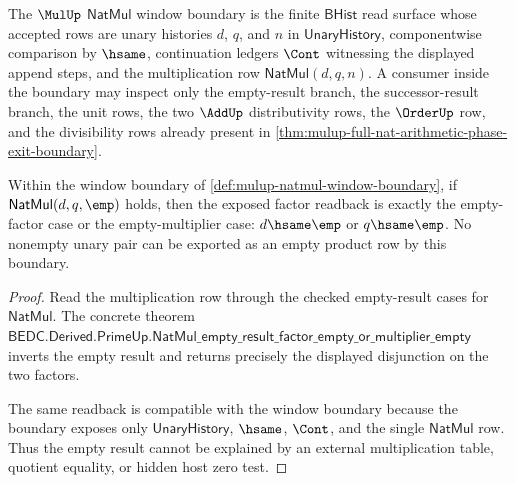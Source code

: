 \begin{definition}
\label{def:mulup-natmul-window-boundary}
The $\MulUp$ $\mathsf{NatMul}$ window boundary is the finite
$\mathsf{BHist}$ read surface whose accepted rows are unary histories
$d$, $q$, and $n$ in $\mathsf{UnaryHistory}$, componentwise comparison by
$\hsame$, continuation ledgers $\Cont$ witnessing the displayed append
steps, and the multiplication row $\mathsf{NatMul}(d,q,n)$. A consumer
inside the boundary may inspect only the empty-result branch, the
successor-result branch, the unit rows, the two $\AddUp$ distributivity
rows, the $\OrderUp$ row, and the divisibility rows already present in
\autoref{thm:mulup-full-nat-arithmetic-phase-exit-boundary}.
\end{definition}

\begin{theorem}
\label{thm:mulup-empty-product-factor-boundary}
Within the window boundary of
\autoref{def:mulup-natmul-window-boundary}, if
$\mathsf{NatMul}(d,q,\emp)$ holds, then the exposed factor readback is
exactly the empty-factor case or the empty-multiplier case:
$d\hsame\emp$ or $q\hsame\emp$. No nonempty unary pair can be exported as
an empty product row by this boundary.
\end{theorem}
\begin{proof}
Read the multiplication row through the checked empty-result cases for
$\mathsf{NatMul}$. The concrete theorem
$\mathsf{BEDC.Derived.PrimeUp.NatMul\_empty\_result\_factor\_empty\_or\_multiplier\_empty}$
inverts the empty result and returns precisely the displayed disjunction
on the two factors.

The same readback is compatible with the window boundary because the
boundary exposes only $\mathsf{UnaryHistory}$, $\hsame$, $\Cont$, and the
single $\mathsf{NatMul}$ row. Thus the empty result cannot be explained
by an external multiplication table, quotient equality, or hidden host
zero test.
\end{proof}

